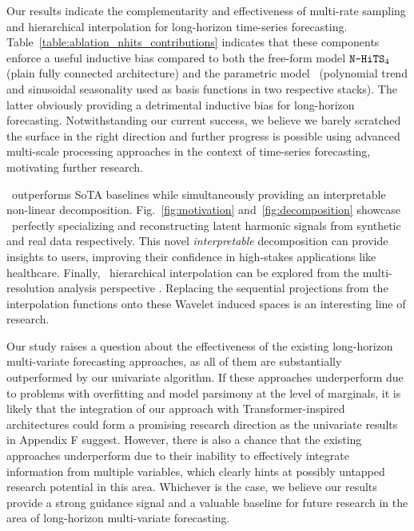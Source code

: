 Our results indicate the complementarity and effectiveness of multi-rate sampling and hierarchical interpolation for long-horizon time-series forecasting. Table~\ref{table:ablation_nhits_contributions} indicates that these components enforce a useful inductive bias compared to both the free-form model $\texttt{{N-HiTS}}_4$ (plain fully connected architecture) and the parametric model \NBEATSi\  (polynomial trend and sinusoidal seasonality used as basis functions in two respective stacks). The latter obviously providing a detrimental inductive bias for long-horizon forecasting. Notwithstanding our current success, we believe we barely scratched the surface in the right direction and further progress is possible using advanced multi-scale processing approaches in the context of time-series forecasting, motivating further research.

\ours\ outperforms SoTA baselines while simultaneously providing an interpretable non-linear decomposition. Fig.~\ref{fig:motivation} and~\ref{fig:decomposition} showcase \ours\ perfectly specializing and reconstructing latent harmonic signals from synthetic and real data respectively. This novel \emph{interpretable} decomposition can provide insights to users, improving their confidence in high-stakes applications like healthcare. Finally, \ours\ hierarchical interpolation can be explored from the multi-resolution analysis perspective \citep{daubechies1992ten}. Replacing the sequential projections from the interpolation functions onto these Wavelet induced spaces is an interesting line of research.

Our study raises a question about the effectiveness of the existing long-horizon multi-variate forecasting approaches, as all of them are substantially outperformed by our univariate algorithm. If these approaches underperform due to problems with overfitting and model parsimony at the level of marginals, it is likely that the integration of our approach with Transformer-inspired architectures could form a promising research direction as the univariate results in Appendix F suggest. However, there is also a chance that the existing approaches underperform due to their inability to effectively integrate information from multiple variables, which clearly hints at possibly untapped research potential in this area. Whichever is the case, we believe our results provide a strong guidance signal and a valuable baseline for future research in the area of long-horizon multi-variate forecasting.